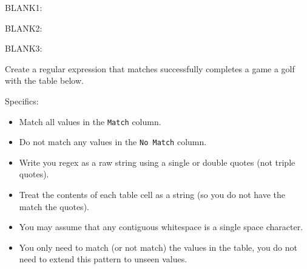 \documentclass[addpoints]{exam}
\begin{document}
\begin{questions}
\begin{minipage}{\textwidth}
\begin{choices}

\choice

BLANK1: \underline{\hspace{1cm}}

\choice

BLANK2: \underline{\hspace{1cm}}

\choice

BLANK3: \underline{\hspace{1cm}}

\end{choices}

\end{minipage}





\vspace{1cm}

\begin{minipage}{\textwidth}

\question[15]

Create a regular expression that matches successfully completes a game a golf with the table below.

Specifics:
\begin{itemize}
    \item Match all values in the \verb|Match| column.
    \item Do not match any values in the \verb|No Match| column.
    \item Write you regex as a raw string using a single or double quotes (not triple quotes).
    \item Treat the contents of each table cell as a string (so you do not have the match the quotes).
    \item You may assume that any contiguous whitespace is a single space character.
    \item You only need to match (or not match) the values in the table, you do not need to extend this pattern to unseen values.
\end{itemize}



\end{minipage}
\end{questions}
\end{document}
